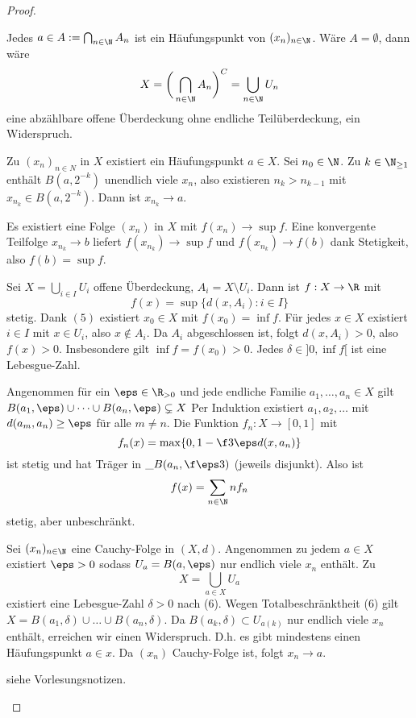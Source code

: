 \begin{st}
\begin{proof}
\begin{seg}[$(2) \implies (3)$]
			Jedes $a \in A := \bigcap_{n\in \N} A_n$ ist ein Häufungspunkt von $(x_n)_{n\in\N}$.
			Wäre $A = \emptyset$, dann wäre
			\[
				X
				= \bigg( \bigcap_{n\in \N} A_n \bigg)^C
				= \bigcup_{n \in \N} U_n
			\]
			eine abzählbare offene Überdeckung ohne endliche Teilüberdeckung, ein Widerspruch.
		\end{seg}
		\begin{seg}[$(3) \implies (4)$]
			Zu $(x_n)_{n\in N}$ in $X$ existiert ein Häufungspunkt $a \in X$.
			Sei $n_0 \in \N$.
			Zu $k \in \N_{\ge 1}$ enthält $B(a, 2^{-k})$ unendlich viele $x_n$, also existieren $n_k > n_{k-1}$ mit $x_{n_k} \in B(a,2^{-k})$.
			Dann ist $x_{n_k} \to a$.
		\end{seg}
		\begin{seg}[$(4) \implies (5)$]
			Es existiert eine Folge $(x_n)$ in $X$ mit $f(x_n) \to \sup f$.
			Eine konvergente Teilfolge $x_{n_k} \to b$ liefert $f(x_{n_k}) \to \sup f$ und $f(x_{n_k}) \to f(b)$ dank Stetigkeit, also $f(b) = \sup f$.
		\end{seg}
		\begin{seg}[$(5) \implies (6)$]
			Sei $X = \bigcup_{i \in I} U_i$ offene Überdeckung, $A_i = X \setminus U_i$.
			Dann ist $f: X \to \R$ mit
			\[
				f(x) = \sup \{ d(x, A_i) : i \in I \}
			\]
			stetig.
			Dank $(5)$ existiert $x_0 \in X$ mit $f(x_0) = \inf f$.
			Für jedes $x \in X$ existiert $i \in I$ mit $x \in U_i$, also $x \not\in A_i$.
			Da $A_i$ abgeschlossen ist, folgt $d(x,A_i) > 0$, also $f(x) > 0$.
			Insbesondere gilt $\inf f = f(x_0) > 0$.
			Jedes $\delta \in ]0, \inf f[$ ist eine Lebesgue-Zahl.

			Angenommen für ein $\eps \in \R_{>0}$ und jede endliche Familie $a_1, \dotsc, a_n \in X$ gilt $B(a_1,\eps) \cup \dotsb \cup B(a_n,\eps) \subsetneq X$
			Per Induktion existiert $a_1, a_2, \dotsc$ mit $d(a_m,a_n) \ge \eps$ für alle $m \neq n$.
			Die Funktion $f_n : X \to [0,1]$ mit
			\[
				f_n(x) = \max \{ 0, 1 - \f 3\eps d(x,a_n) \}
			\]
			ist stetig und hat Träger in $\_B(a_n, \f \eps3)$ (jeweils disjunkt).
			Also ist
			\[
				f(x) = \sum_{n\in \N} n f_n
			\]
			stetig, aber unbeschränkt.
		\end{seg}
		\begin{seg}[$(6) \implies (7)$]
			Sei $(x_n)_{n \in \N}$ eine Cauchy-Folge in $(X,d)$.
			Angenommen zu jedem $a \in X$ existiert $\eps > 0$ sodass $U_a = B(a, \eps)$ nur endlich viele $x_n$ enthält.
			Zu
			\[
				X = \bigcup_{a \in X} U_a
			\]
			existiert eine Lebesgue-Zahl $\delta > 0$ nach (6).
			Wegen Totalbeschränktheit (6) gilt $X = B(a_1, \delta) \cup \dotsc \cup B(a_n,\delta)$.
			Da $B(a_k,\delta) \subset U_{a(k)}$ nur endlich viele $x_n$ enthält, erreichen wir einen Widerspruch.
			D.h. es gibt mindestens einen Häufungspunkt $a \in x$.
			Da $(x_n)$ Cauchy-Folge ist, folgt $x_n \to a$.
		\end{seg}
		\begin{seg}
			siehe Vorlesungsnotizen.
		\end{seg}
	\end{proof}
\end{st}

